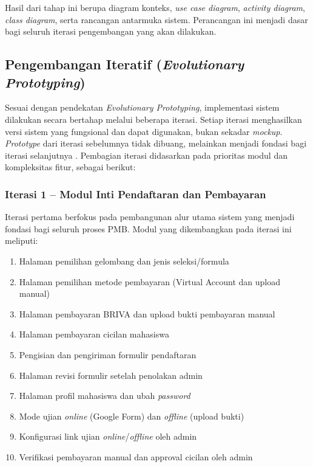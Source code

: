Hasil dari tahap ini berupa diagram konteks, \textit{use case diagram}, \textit{activity diagram}, \textit{class diagram}, serta rancangan antarmuka sistem. Perancangan ini menjadi dasar bagi seluruh iterasi pengembangan yang akan dilakukan.\par

\subsection{Pengembangan Iteratif (\textit{Evolutionary Prototyping})} \label{III.PengembanganIteratif}
Sesuai dengan pendekatan \textit{Evolutionary Prototyping}, implementasi sistem dilakukan secara bertahap melalui beberapa iterasi. Setiap iterasi menghasilkan versi sistem yang fungsional dan dapat digunakan, bukan sekadar \textit{mockup}. \textit{Prototype} dari iterasi sebelumnya tidak dibuang, melainkan menjadi fondasi bagi iterasi selanjutnya \cite{crinnion1991evolutionary}. Pembagian iterasi didasarkan pada prioritas modul dan kompleksitas fitur, sebagai berikut:\par

\subsubsection{Iterasi 1 -- Modul Inti Pendaftaran dan Pembayaran}
Iterasi pertama berfokus pada pembangunan alur utama sistem yang menjadi fondasi bagi seluruh proses PMB. Modul yang dikembangkan pada iterasi ini meliputi:\par
\begin{enumerate}[noitemsep]
	\item Halaman pemilihan gelombang dan jenis seleksi/formula
	\item Halaman pemilihan metode pembayaran (Virtual Account dan upload manual)
	\item Halaman pembayaran BRIVA dan upload bukti pembayaran manual
	\item Halaman pembayaran cicilan mahasiswa
	\item Pengisian dan pengiriman formulir pendaftaran
	\item Halaman revisi formulir setelah penolakan admin
	\item Halaman profil mahasiswa dan ubah \textit{password}
	\item Mode ujian \textit{online} (Google Form) dan \textit{offline} (upload bukti)
	\item Konfigurasi link ujian \textit{online}/\textit{offline} oleh admin
	\item Verifikasi pembayaran manual dan approval cicilan oleh admin
\end{enumerate}

